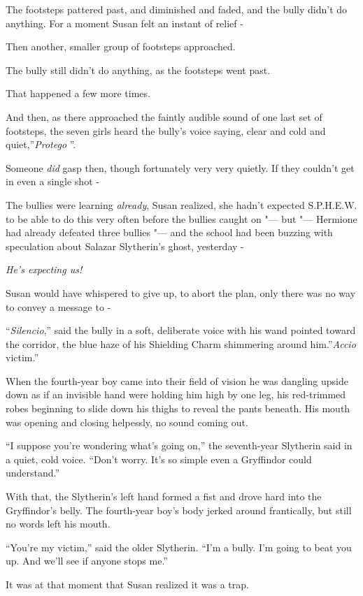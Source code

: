 The footsteps pattered past, and diminished and faded, and the bully
didn't do anything. For a moment Susan felt an instant of relief -

Then another, smaller group of footsteps approached.

The bully still didn't do anything, as the footsteps went past.

That happened a few more times.

And then, as there approached the faintly audible sound of one last set
of footsteps, the seven girls heard the bully's voice saying, clear and
cold and quiet,''\emph{Protego} ''.

Someone \emph{did} gasp then, though fortunately very very quietly. If
they couldn't get in even a single shot -

The bullies were learning \emph{already}, Susan realized, she hadn't
expected S.P.H.E.W. to be able to do this very often before the bullies
caught on "--- but "--- Hermione had already defeated three bullies "--- and the
school had been buzzing with speculation about Salazar Slytherin's
ghost, yesterday -

\emph{He's expecting us!}

Susan would have whispered to give up, to abort the plan, only there was
no way to convey a message to -

``\emph{Silencio},'' said the bully in a soft, deliberate voice with his
wand pointed toward the corridor, the blue haze of his Shielding Charm
shimmering around him.''\emph{Accio} victim.''

When the fourth-year boy came into their field of vision he was dangling
upside down as if an invisible hand were holding him high by one leg,
his red-trimmed robes beginning to slide down his thighs to reveal the
pants beneath. His mouth was opening and closing helpessly, no sound
coming out.

``I suppose you're wondering what's going on,'' the seventh-year
Slytherin said in a quiet, cold voice. ``Don't worry. It's so simple
even a Gryffindor could understand.''

With that, the Slytherin's left hand formed a fist and drove hard into
the Gryffindor's belly. The fourth-year boy's body jerked around
frantically, but still no words left his mouth.

``You're my victim,'' said the older Slytherin. ``I'm a bully. I'm going
to beat you up. And we'll see if anyone stops me.''

It was at that moment that Susan realized it was a trap.

